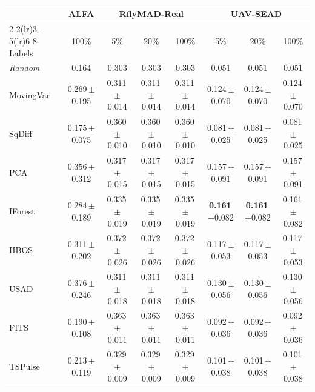 \begin{tabular}{lccccccc}
\toprule
 & ALFA & \multicolumn{3}{c}{RflyMAD-Real} & \multicolumn{3}{c}{UAV-SEAD} \\
\cmidrule(lr){2-2}\cmidrule(lr){3-5}\cmidrule(lr){6-8}
Labels & 100\% & 5\% & 20\% & 100\% & 5\% & 20\% & 100\% \\
\midrule
\textit{Random} & 0.164 & 0.303 & 0.303 & 0.303 & 0.051 & 0.051 & 0.051 \\
\midrule
MovingVar & 0.269\,\scriptsize{$\pm$0.195} & 0.311\,\scriptsize{$\pm$0.014} & 0.311\,\scriptsize{$\pm$0.014} & 0.311\,\scriptsize{$\pm$0.014} & 0.124\,\scriptsize{$\pm$0.070} & 0.124\,\scriptsize{$\pm$0.070} & 0.124\,\scriptsize{$\pm$0.070} \\
SqDiff & 0.175\,\scriptsize{$\pm$0.075} & 0.360\,\scriptsize{$\pm$0.010} & 0.360\,\scriptsize{$\pm$0.010} & 0.360\,\scriptsize{$\pm$0.010} & 0.081\,\scriptsize{$\pm$0.025} & 0.081\,\scriptsize{$\pm$0.025} & 0.081\,\scriptsize{$\pm$0.025} \\
\midrule
PCA & 0.356\,\scriptsize{$\pm$0.312} & 0.317\,\scriptsize{$\pm$0.015} & 0.317\,\scriptsize{$\pm$0.015} & 0.317\,\scriptsize{$\pm$0.015} & 0.157\,\scriptsize{$\pm$0.091} & 0.157\,\scriptsize{$\pm$0.091} & 0.157\,\scriptsize{$\pm$0.091} \\
IForest & 0.284\,\scriptsize{$\pm$0.189} & 0.335\,\scriptsize{$\pm$0.019} & 0.335\,\scriptsize{$\pm$0.019} & 0.335\,\scriptsize{$\pm$0.019} & \textbf{0.161}\,\scriptsize{$\pm$0.082} & \textbf{0.161}\,\scriptsize{$\pm$0.082} & 0.161\,\scriptsize{$\pm$0.082} \\
HBOS & 0.311\,\scriptsize{$\pm$0.202} & 0.372\,\scriptsize{$\pm$0.026} & 0.372\,\scriptsize{$\pm$0.026} & 0.372\,\scriptsize{$\pm$0.026} & 0.117\,\scriptsize{$\pm$0.053} & 0.117\,\scriptsize{$\pm$0.053} & 0.117\,\scriptsize{$\pm$0.053} \\
USAD & 0.376\,\scriptsize{$\pm$0.246} & 0.311\,\scriptsize{$\pm$0.018} & 0.311\,\scriptsize{$\pm$0.018} & 0.311\,\scriptsize{$\pm$0.018} & 0.130\,\scriptsize{$\pm$0.056} & 0.130\,\scriptsize{$\pm$0.056} & 0.130\,\scriptsize{$\pm$0.056} \\
FITS & 0.190\,\scriptsize{$\pm$0.108} & 0.363\,\scriptsize{$\pm$0.011} & 0.363\,\scriptsize{$\pm$0.011} & 0.363\,\scriptsize{$\pm$0.011} & 0.092\,\scriptsize{$\pm$0.036} & 0.092\,\scriptsize{$\pm$0.036} & 0.092\,\scriptsize{$\pm$0.036} \\
\midrule
TSPulse & 0.213\,\scriptsize{$\pm$0.119} & 0.329\,\scriptsize{$\pm$0.009} & 0.329\,\scriptsize{$\pm$0.009} & 0.329\,\scriptsize{$\pm$0.009} & 0.101\,\scriptsize{$\pm$0.038} & 0.101\,\scriptsize{$\pm$0.038} & 0.101\,\scriptsize{$\pm$0.038} \\

\end{tabular}
